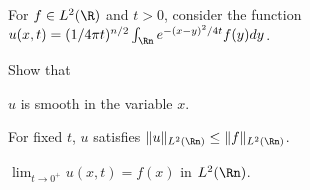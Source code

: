 For $f\in L^2(\R)$ and $t>0$, consider the function $u(x,t)=(1/4\pi
t)^{n/2}\int_{\Rn}e^{-(x-y)^2/4t}f(y)dy$.

Show that
\begin{alist}
\item $u$ is smooth in the variable $x$.
\item For fixed $t$, $u$ satisfies 
$\|u\|_{L^2(\Rn)}\leq \|f\|_{L^2(\Rn)}$.
\item $\lim_{t\rightarrow 0^+}u(x,t)=f(x)$ in $L^2(\Rn)$.
\end{alist}
